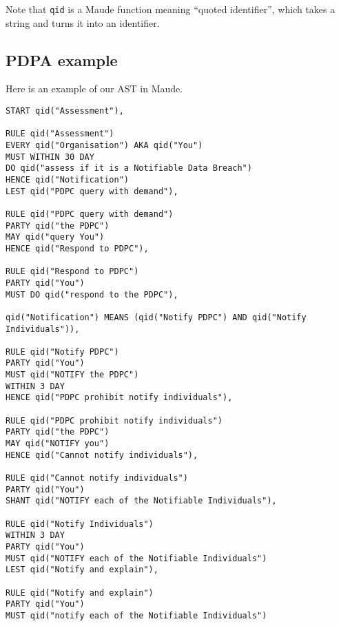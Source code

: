 \documentclass{article}
\begin{document}
Note that \texttt{qid} is a Maude function meaning ``quoted identifier'', which
takes a string and turns it into an identifier.

\subsection{PDPA example}

Here is an example of our AST in Maude.

\begin{lstlisting}
START qid("Assessment"),

RULE qid("Assessment")
EVERY qid("Organisation") AKA qid("You")
MUST WITHIN 30 DAY
DO qid("assess if it is a Notifiable Data Breach")
HENCE qid("Notification")
LEST qid("PDPC query with demand"),

RULE qid("PDPC query with demand")
PARTY qid("the PDPC")
MAY qid("query You")
HENCE qid("Respond to PDPC"),

RULE qid("Respond to PDPC")
PARTY qid("You")
MUST DO qid("respond to the PDPC"),

qid("Notification") MEANS (qid("Notify PDPC") AND qid("Notify Individuals")),

RULE qid("Notify PDPC")
PARTY qid("You")
MUST qid("NOTIFY the PDPC")
WITHIN 3 DAY
HENCE qid("PDPC prohibit notify individuals"),

RULE qid("PDPC prohibit notify individuals")
PARTY qid("the PDPC")
MAY qid("NOTIFY you")
HENCE qid("Cannot notify individuals"),

RULE qid("Cannot notify individuals")
PARTY qid("You")
SHANT qid("NOTIFY each of the Notifiable Individuals"),

RULE qid("Notify Individuals")
WITHIN 3 DAY
PARTY qid("You")
MUST qid("NOTIFY each of the Notifiable Individuals")
LEST qid("Notify and explain"),

RULE qid("Notify and explain")
PARTY qid("You")
MUST qid("notify each of the Notifiable Individuals")

\end{lstlisting}
\end{document}
